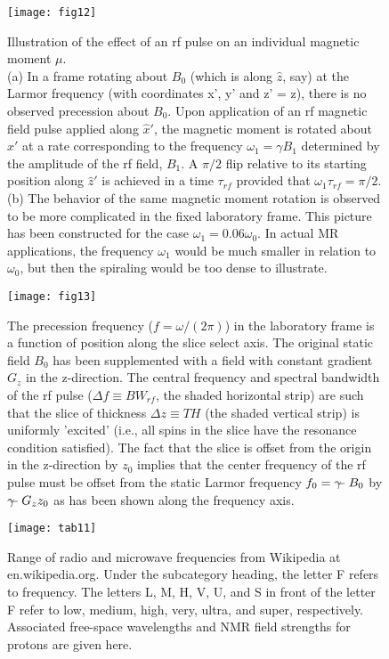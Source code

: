 \begin{figure}[H]
	\centering
	\texttt{[image: fig12]}
	\caption{
Illustration of the effect of an rf pulse on an individual magnetic moment $\mu$. \\
(a) In a frame rotating about $B_0$ (which is along $\hat{z}$, say) at the Larmor frequency (with coordinates
x', y' and z' = z), there is no observed precession about $B_0$. Upon application of an rf magnetic
field pulse applied along $\hat{x}'$, the magnetic moment is rotated about $\hat{x}'$ at a rate corresponding to
the frequency $\omega_1 = \gamma B_1$ determined by the amplitude of the rf field, $B_1$. A $\pi/2$ flip
relative to its starting position along $\hat{z}'$ is achieved in a 
time $\tau_{rf}$ provided that $\omega_1 \tau_{rf} = \pi/2$.\\
(b) The behavior of the same magnetic moment rotation is observed to be more complicated in the fixed laboratory
frame. This picture has been constructed for the case $\omega_1 = 0.06 \omega_0$. In actual MR applications, the
frequency $\omega_1$ would be much smaller in relation to $\omega_0$, but then the spiraling would be too dense
to illustrate.
}
	\label{fig:fig12}
\end{figure}

\begin{figure}[H]
	\centering
	\texttt{[image: fig13]}
	\caption{
The precession frequency ($f = \omega/(2\pi)$) in the laboratory frame is a function of position
along the slice select axis. The original static field $B_0$ has been supplemented with a field with
constant gradient $G_z$ in the z-direction. The central frequency and spectral bandwidth of the rf
pulse ($\Delta f \equiv BW_{rf}$, the shaded horizontal strip) are such that the slice of thickness 
$\Delta z \equiv T H$ (the
shaded vertical strip) is uniformly 'excited' (i.e., all spins in the slice have the resonance condition
satisfied). The fact that the slice is offset from the origin in the z-direction by $z_0$ implies that the
center frequency of the rf pulse must be offset from the static Larmor frequency $f_0 = \gamma\kern-0.65em- B_0$ by $\gamma\kern-0.65em- G_z z_0$ as has been shown along the frequency axis. }
	\label{fig:fig13}
\end{figure}

\begin{figure}[H]
	\centering
	\texttt{[image: tab11]}
	\caption{
Range of radio and microwave frequencies from Wikipedia at en.wikipedia.org. Under
the subcategory heading, the letter F refers to frequency. The letters L, M, H, V, U, and S in front
of the letter F refer to low, medium, high, very, ultra, and super, respectively. Associated free-space
wavelengths and NMR field strengths for protons are given here.
}
	\label{fig:tab11}
\end{figure}
